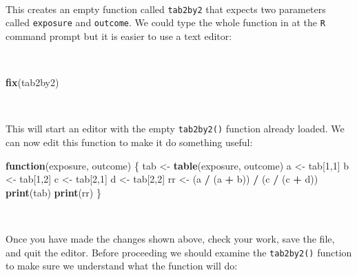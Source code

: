 \documentclass[12pt,a4paper]{book}
\newenvironment{Shaded}{\begin{snugshade}}{\end{snugshade}}
\newcommand{\KeywordTok}[1]{\textcolor[rgb]{0.13,0.29,0.53}{\textbf{#1}}}
\newcommand{\DecValTok}[1]{\textcolor[rgb]{0.00,0.00,0.81}{#1}}
\newcommand{\StringTok}[1]{\textcolor[rgb]{0.31,0.60,0.02}{#1}}
\newcommand{\ControlFlowTok}[1]{\textcolor[rgb]{0.13,0.29,0.53}{\textbf{#1}}}
\newcommand{\OperatorTok}[1]{\textcolor[rgb]{0.81,0.36,0.00}{\textbf{#1}}}
\newcommand{\NormalTok}[1]{#1}
\theoremstyle{definition}
\theoremstyle{definition}
\theoremstyle{definition}
\theoremstyle{remark}
\begin{document}
~

This creates an empty function called \texttt{tab2by2} that expects two
parameters called \texttt{exposure} and \texttt{outcome}. We could type
the whole function in at the \texttt{R} command prompt but it is easier
to use a text editor:

~

\begin{Shaded}
\begin{Highlighting}[]
\KeywordTok{fix}\NormalTok{(tab2by2)}
\end{Highlighting}
\end{Shaded}

~

This will start an editor with the empty \texttt{tab2by2()} function
already loaded. We can now edit this function to make it do something
useful:

\newpage

\begin{Shaded}
\begin{Highlighting}[]
\ControlFlowTok{function}\NormalTok{(exposure, outcome)}
\NormalTok{  \{}
\NormalTok{  tab <-}\StringTok{ }\KeywordTok{table}\NormalTok{(exposure, outcome)}
\NormalTok{  a <-}\StringTok{ }\NormalTok{tab[}\DecValTok{1}\NormalTok{,}\DecValTok{1}\NormalTok{]}
\NormalTok{  b <-}\StringTok{ }\NormalTok{tab[}\DecValTok{1}\NormalTok{,}\DecValTok{2}\NormalTok{]}
\NormalTok{  c <-}\StringTok{ }\NormalTok{tab[}\DecValTok{2}\NormalTok{,}\DecValTok{1}\NormalTok{]}
\NormalTok{  d <-}\StringTok{ }\NormalTok{tab[}\DecValTok{2}\NormalTok{,}\DecValTok{2}\NormalTok{]}
\NormalTok{  rr <-}\StringTok{ }\NormalTok{(a }\OperatorTok{/}\StringTok{ }\NormalTok{(a }\OperatorTok{+}\StringTok{ }\NormalTok{b)) }\OperatorTok{/}\StringTok{ }\NormalTok{(c }\OperatorTok{/}\StringTok{ }\NormalTok{(c }\OperatorTok{+}\StringTok{ }\NormalTok{d))}
  \KeywordTok{print}\NormalTok{(tab)}
  \KeywordTok{print}\NormalTok{(rr) }
\NormalTok{  \}}
\end{Highlighting}
\end{Shaded}

~

Once you have made the changes shown above, check your work, save the
file, and quit the editor. Before proceeding we should examine the
\texttt{tab2by2()} function to make sure we understand what the function
will do:
\end{document}

